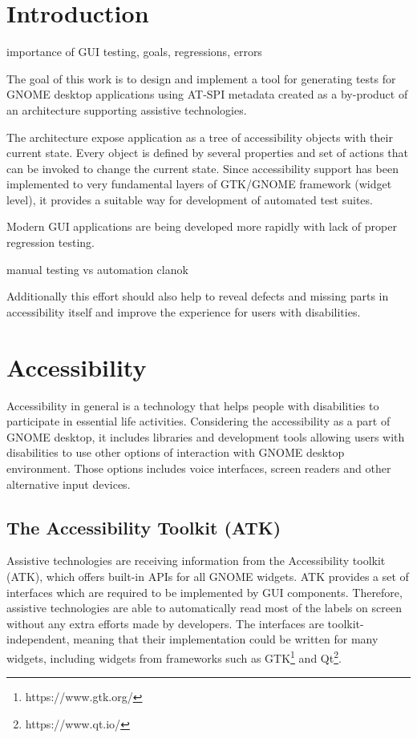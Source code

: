 
\chapter{Introduction}
importance of GUI testing, goals, regressions, errors 

The goal of this work is to design and implement a tool for generating tests for GNOME desktop applications using AT-SPI metadata created as a by-product of an architecture supporting assistive technologies.

The architecture expose application as a tree of accessibility objects with their current state. Every object is defined by several properties and set of actions that can be invoked to change the current state. Since accessibility support has been implemented to very fundamental layers of GTK/GNOME framework (widget level), it provides a suitable way for development of automated test suites.\cite{pyatspi2} 

Modern GUI applications are being developed more rapidly with lack of proper regression testing. 

manual testing vs automation clanok

Additionally this effort should also help to reveal defects and missing parts in accessibility itself and improve the experience for users with disabilities.

\chapter{Accessibility}
Accessibility in general is a technology that helps people with disabilities to participate in essential life activities. Considering the accessibility as a part of GNOME desktop, it includes libraries and development tools allowing users with disabilities to use other options of interaction with GNOME desktop environment. Those options includes voice interfaces, screen readers and other alternative input devices.\cite{gnomeADG}
\section{The Accessibility Toolkit (ATK)}
Assistive technologies are receiving information from the Accessibility toolkit (ATK), which offers built-in APIs for all GNOME widgets. ATK provides a set of interfaces which are required to be implemented by GUI components. Therefore, assistive technologies are able to automatically read most of the labels on screen without any extra efforts made by developers. The interfaces are toolkit-independent, meaning that their implementation could be written for many widgets, including widgets from frameworks such as GTK\footnote{https://www.gtk.org/} and Qt\footnote{https://www.qt.io/}.
